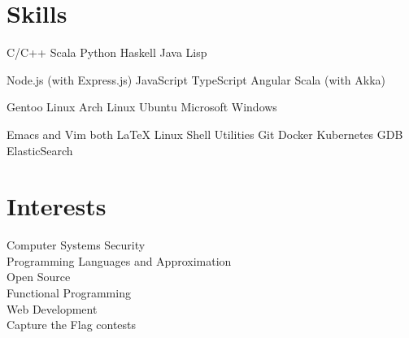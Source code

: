 \documentclass[a4paper]{deedy-resume} %
\begin{document}
\begin{minipage}[t]{0.33\textwidth}
  \sectionspace

  \section{Skills}

  \runsubsection{}
  C/C++ \textbullet{} Scala \textbullet{} Python \textbullet{} Haskell
  \textbullet{} Java \textbullet{} Lisp

  \sectionspace
  \sectionspace

  Node.js (with Express.js) \textbullet{} JavaScript \textbullet{} TypeScript
  \textbullet{} Angular \textbullet Scala (with Akka) \\

  \sectionspace
  \sectionspace

  Gentoo Linux \textbullet{} Arch Linux \textbullet{} Ubuntu \textbullet{}
  Microsoft Windows

  \sectionspace
  \sectionspace

  Emacs and Vim both \textbullet{} LaTeX \textbullet{} Linux Shell
  Utilities \textbullet{} Git \textbullet{} Docker \textbullet{}
  Kubernetes \textbullet{} GDB \textbullet ElasticSearch

  \sectionspace
  \sectionspace

  \section{Interests}
  Computer Systems Security\\
  Programming Languages and Approximation\\
  Open Source\\
  Functional Programming\\
  Web Development\\
  Capture the Flag contests

\end{minipage}
\hfill
\end{document}
